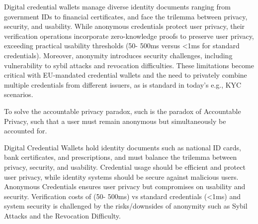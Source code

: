 Digital credential wallets manage diverse identity documents ranging from government IDs to financial certificates, and face the trilemma between privacy, security, and usability. While anonymous credentials protect user privacy, their verification operations incorporate zero-knowledge proofs to preserve user privacy, exceeding practical usability thresholds (50- 500ms versus <1ms for standard credentials). Moreover, anonymity introduces security challenges, including vulnerability to sybil attacks and revocation difficulties. These limitations become critical with EU-mandated credential wallets and the need to privately combine multiple credentials from different issuers, as is standard in today's e.g., KYC scenarios.








To solve the accountable privacy paradox, 
such is the paradox of Accountable Privacy, such that a user must remain anonymous but simultaneously be accounted for. 






Digital Credential Wallets hold identity documents such as national ID cards, bank certificates, and prescriptions, and must balance the trilemma between privacy, security, and usability. Credential usage should be efficient and protect user privacy, while identity systems should be secure against malicious users.
Anonymous Credentials ensures user privacy but compromises on usability and security. Verification costs of (50- 500ms) vs standard credentials (<1ms) and system security is challenged by the risks/downsides of anonymity such as Sybil Attacks and the Revocation Difficulty. 




